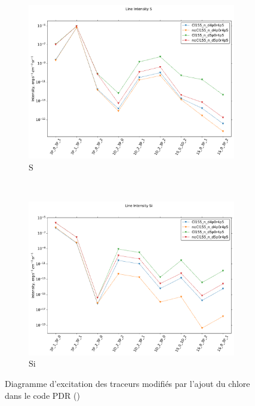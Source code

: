\begin{figure}[!htbp]
    \begin{subfigure}[t]{0.45\textwidth} %
        \centering \includegraphics[trim = {0 0 0 1.5cm},clip,width=1\textwidth]{figure/Cl/gridModelEmiss/I_comp_S.pdf}
        \caption{$\mathrm{S}$}
    \end{subfigure}
    ~
    \begin{subfigure}[t]{0.45\textwidth} %
        \centering \includegraphics[trim = {0 0 0 1.5cm},clip,width=1\textwidth]{figure/Cl/gridModelEmiss/I_comp_Si.pdf}
        \caption{$\mathrm{Si}$}
    \end{subfigure}
    
    \caption{Diagramme d'excitation des traceurs modifiés par l'ajout du chlore dans le code PDR (\uncinq)}
    \label{fig:Cl:gridModelEmiss:yes}
\end{figure}

